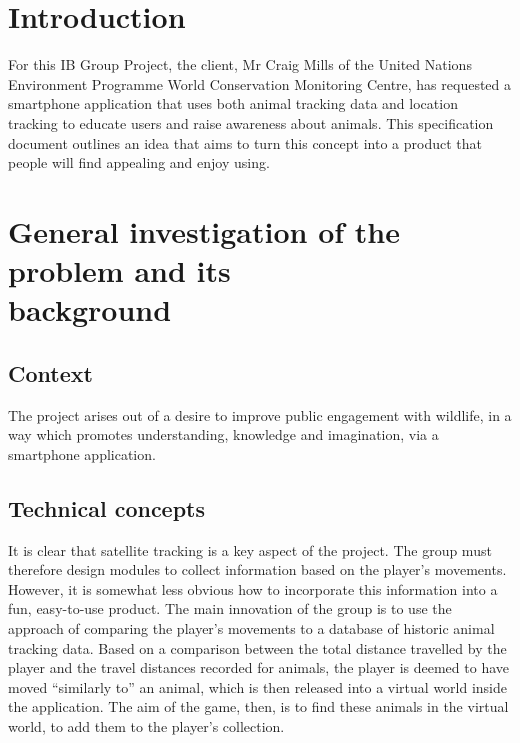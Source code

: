\documentclass[12pt,a4paper,twoside]{article}
\begin{document}

\newpage
\pagestyle{empty}
\cleardoublepage                             %
\newpage


\section{Introduction}

For this IB Group Project, the client, Mr Craig Mills of the United Nations Environment Programme World Conservation Monitoring Centre, has requested a smartphone application that uses both animal tracking data and location tracking to educate users and raise awareness about animals. This specification document outlines an idea that aims to turn this concept into a product that people will find appealing and enjoy using.

\section{General investigation of the problem and its \\ background}
\subsection{Context}

The project arises out of a desire to improve public engagement with wildlife, in a way which promotes understanding, knowledge and imagination, via a smartphone application.


\subsection{Technical concepts}
It is clear that satellite tracking is a key aspect of the project.
The group must therefore design modules to collect information based on the player's movements.
However, it is somewhat less obvious how to incorporate this information into a fun, easy-to-use product.
The main innovation of the group is to use the approach of comparing the player's movements to a database of historic animal tracking data.
Based on a comparison between the total distance travelled by the player and the travel distances recorded for animals, the player is deemed to have moved ``similarly to'' an animal, which is then released into a virtual world inside the application.
The aim of the game, then, is to find these animals in the virtual world, to add them to the player's collection.
\end{document}
